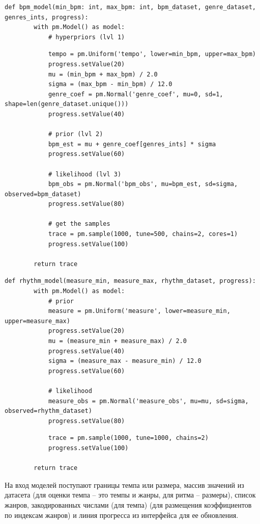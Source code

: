 \begin{lstlisting}[label={lst:bpmmodel}, caption={реализация байесовской модели для определения темпа}]
	def bpm_model(min_bpm: int, max_bpm: int, bpm_dataset, genre_dataset, genres_ints, progress):
		with pm.Model() as model:
			# hyperpriors (lvl 1)
\end{lstlisting}

\begin{lstlisting}
			tempo = pm.Uniform('tempo', lower=min_bpm, upper=max_bpm)
			progress.setValue(20)
			mu = (min_bpm + max_bpm) / 2.0
			sigma = (max_bpm - min_bpm) / 12.0
			genre_coef = pm.Normal('genre_coef', mu=0, sd=1, shape=len(genre_dataset.unique()))
			progress.setValue(40)
	
			# prior (lvl 2)
			bpm_est = mu + genre_coef[genres_ints] * sigma
			progress.setValue(60)
	
			# likelihood (lvl 3)
			bpm_obs = pm.Normal('bpm_obs', mu=bpm_est, sd=sigma, observed=bpm_dataset)
			progress.setValue(80)
	
			# get the samples
			trace = pm.sample(1000, tune=500, chains=2, cores=1)
			progress.setValue(100)
	
		return trace
\end{lstlisting}

\begin{lstlisting}[label={lst:measuremodel}, caption={реализация байесовской модели для определения ритма}]
	def rhythm_model(measure_min, measure_max, rhythm_dataset, progress):
		with pm.Model() as model:
			# prior
			measure = pm.Uniform('measure', lower=measure_min, upper=measure_max)
			progress.setValue(20)
			mu = (measure_min + measure_max) / 2.0
			progress.setValue(40)
			sigma = (measure_max - measure_min) / 12.0
			progress.setValue(60)
	
			# likelihood
			measure_obs = pm.Normal('measure_obs', mu=mu, sd=sigma, observed=rhythm_dataset)
			progress.setValue(80)
\end{lstlisting}

\begin{lstlisting}
			trace = pm.sample(1000, tune=1000, chains=2)
			progress.setValue(100)
	
		return trace
\end{lstlisting}

На вход моделей поступают границы темпа или размера, массив значений из датасета (для оценки темпа -- это темпы и жанры, для ритма -- размеры), список жанров, закодированных числами (для темпа) (для размещения коэффициентов по индексам жанров) и линия прогресса из интерфейса для ее обновления.


